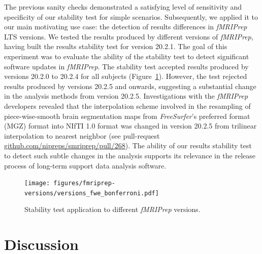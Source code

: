 \documentclass[lettersize,journal]{IEEEtran}
\newcommand{\fmriprep}{\emph{fMRIPrep}\xspace}
\begin{document}
The previous sanity checks demonstrated a satisfying level of sensitivity and specificity of our stability test for simple scenarios. Subsequently, we applied it to our main motivating use case: the detection of results differences in \fmriprep LTS versions. We tested the results produced by different versions of \fmriprep, having built the results stability test for version 20.2.1. The goal of this experiment was to evaluate the ability of the stability test to detect significant software updates in \fmriprep. The stability test accepted results produced by versions 20.2.0 to 20.2.4 for all subjects (Figure~\ref{fig:version_bonferroni}). However, the test rejected results produced by versions 20.2.5 and onwards, suggesting a substantial change in the analysis methods from version 20.2.5. Investigations with the \fmriprep developers revealed that the interpolation scheme involved in the resampling of piece-wise-smooth brain segmentation maps from \emph{FreeSurfer}'s preferred format (MGZ) format into NIfTI 1.0 format was changed in version {20.2.5} from trilinear interpolation to nearest neighbor (see pull-request \href{https://github.com/nipreps/smriprep/pull/268}{\url{github.com/nipreps/smriprep/pull/268}}). The ability of our results stability test to detect such subtle changes in the analysis supports its relevance in the release process of long-term support data analysis software.

\begin{figure}
    \centering
    \texttt{[image: figures/fmriprep-versions/versions\_fwe\_bonferroni.pdf]}
    \caption{Stability test application to different \fmriprep versions.}
    \label{fig:version_bonferroni}
\end{figure}


\section{Discussion}
\end{document}
